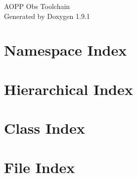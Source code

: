 \let\mypdfximage\pdfximage\def\pdfximage{\immediate\mypdfximage}\documentclass[twoside]{book}
\newcommand{\+}{\discretionary{\mbox{\scriptsize$\hookleftarrow$}}{}{}}
\newcommand{\clearemptydoublepage}{%
  \newpage{\pagestyle{empty}\cleardoublepage}%
}
\begin{document}
\raggedbottom

\hypersetup{pageanchor=false,
             bookmarksnumbered=true,
             pdfencoding=unicode
            }
\begin{titlepage}
\vspace*{7cm}
\begin{center}%
{\Large AOPP Obs Toolchain }\\
\vspace*{1cm}
{\large Generated by Doxygen 1.9.1}\\
\end{center}
\end{titlepage}
\clearemptydoublepage
{}
\tableofcontents
\clearemptydoublepage
{}
\hypersetup{pageanchor=true}

\chapter{Namespace Index}

\chapter{Hierarchical Index}

\chapter{Class Index}

\chapter{File Index}

\end{document}
